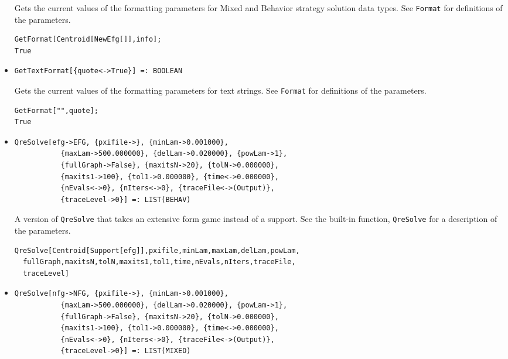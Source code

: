 \begin{itemize}
\bd
Gets the current values of the formatting parameters for Mixed and
Behavior strategy solution data types.  See \verb+Format+ for
definitions of the parameters.  
\begin{verbatim}
GetFormat[Centroid[NewEfg[]],info];
True
\end{verbatim} 
\ed

\item{}
\protect \large \begin{verbatim}
GetTextFormat[{quote<->True}] =: BOOLEAN 
\end{verbatim} \normalsize

\bd
Gets the current values of the formatting parameters for text strings.  See
\verb+Format+ for definitions of the parameters. 
\begin{verbatim}
GetFormat["",quote];
True
\end{verbatim} 
\ed

\item{}
\protect \large \begin{verbatim}
QreSolve[efg->EFG, {pxifile->}, {minLam->0.001000}, 
           {maxLam->500.000000}, {delLam->0.020000}, {powLam->1}, 
           {fullGraph->False}, {maxitsN->20}, {tolN->0.000000}, 
           {maxits1->100}, {tol1->0.000000}, {time<->0.000000}, 
           {nEvals<->0}, {nIters<->0}, {traceFile<->(Output)}, 
           {traceLevel->0}] =: LIST(BEHAV) 
\end{verbatim}\normalsize

\bd 
A version of \verb+QreSolve+ that takes an extensive form
game instead of a support.  See the built-in function,
\verb+QreSolve+ for a description of the parameters.
\begin{verbatim}
QreSolve[Centroid[Support[efg]],pxifile,minLam,maxLam,delLam,powLam, 
  fullGraph,maxitsN,tolN,maxits1,tol1,time,nEvals,nIters,traceFile,
  traceLevel]
\end{verbatim} 
\ed

\item{}
\protect \large \begin{verbatim}
QreSolve[nfg->NFG, {pxifile->}, {minLam->0.001000}, 
           {maxLam->500.000000}, {delLam->0.020000}, {powLam->1}, 
           {fullGraph->False}, {maxitsN->20}, {tolN->0.000000}, 
           {maxits1->100}, {tol1->0.000000}, {time<->0.000000}, 
           {nEvals<->0}, {nIters<->0}, {traceFile<->(Output)}, 
           {traceLevel->0}] =: LIST(MIXED) 
\end{verbatim}\normalsize


\end{itemize}
